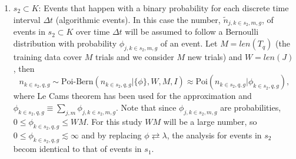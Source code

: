 \begin{example}
\begin{enumerate}
		\item $s_2\subset K$: Events that happen with a binary probability for each discrete time interval $\Delta t$ (algorithmic events). In this case the number, $\tilde{n}_{j,k\in s_2,m,g}$, of events in $s_2\subset K$ over time $\Delta t$ will be assumed to follow a Bernoulli distribution with probability $\phi_{j,k\in s_2,m,g}$ of an event. Let $M = len(T_q)$ (the training data cover $M$ trials and we consider $M$ new trials) and $W=len(J)$, then
		\begin{equation}
			n_{k\in s_2,q,g} \sim \text{Poi-Bern}(n_{k\in s_2,q,g}|\{\phi\},W,M,I)\approx \text{Poi}(n_{k\in s_2,q,g}|\phi_{k\in s_2,q,g}),
		\end{equation}
		where Le Cams theorem has been used for the approximation and $\phi_{k\in s_2,q,g}\equiv \sum_{j,m}\phi_{j,k\in s_2,m,g}$. Note that since $\phi_{j,k\in s_2,m,g}$ are probabilities, $0\leq \phi_{k\in s_2,q,g}\leq WM$. For this study $WM$ will be a large number, so $0\leq \phi_{k\in s_2,q,g}\lesssim \infty$ and by replacing $\phi\rightleftarrows \lambda$, the analysis for events in $s_2$ becom identical to that of events in $s_1$. 
	\end{enumerate}
	

\end{example}
